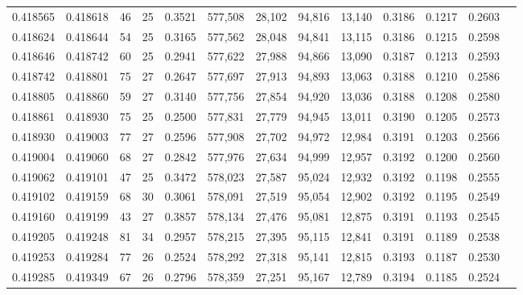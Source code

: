 \begin{tabular}{rrrrrrrrrrrrr}
0.418565 & 0.418618 &    46 &  25 &                                     0.3521 & 577,508 &  28,102 &  94,816 &  13,140 & 0.3186 & 0.1217 & 0.2603 \\
0.418624 & 0.418644 &    54 &  25 &                                     0.3165 & 577,562 &  28,048 &  94,841 &  13,115 & 0.3186 & 0.1215 & 0.2598 \\
0.418646 & 0.418742 &    60 &  25 &                                     0.2941 & 577,622 &  27,988 &  94,866 &  13,090 & 0.3187 & 0.1213 & 0.2593 \\
0.418742 & 0.418801 &    75 &  27 &                                     0.2647 & 577,697 &  27,913 &  94,893 &  13,063 & 0.3188 & 0.1210 & 0.2586 \\
0.418805 & 0.418860 &    59 &  27 &                                     0.3140 & 577,756 &  27,854 &  94,920 &  13,036 & 0.3188 & 0.1208 & 0.2580 \\
0.418861 & 0.418930 &    75 &  25 &                                     0.2500 & 577,831 &  27,779 &  94,945 &  13,011 & 0.3190 & 0.1205 & 0.2573 \\
0.418930 & 0.419003 &    77 &  27 &                                     0.2596 & 577,908 &  27,702 &  94,972 &  12,984 & 0.3191 & 0.1203 & 0.2566 \\
0.419004 & 0.419060 &    68 &  27 &                                     0.2842 & 577,976 &  27,634 &  94,999 &  12,957 & 0.3192 & 0.1200 & 0.2560 \\
0.419062 & 0.419101 &    47 &  25 &                                     0.3472 & 578,023 &  27,587 &  95,024 &  12,932 & 0.3192 & 0.1198 & 0.2555 \\
0.419102 & 0.419159 &    68 &  30 &                                     0.3061 & 578,091 &  27,519 &  95,054 &  12,902 & 0.3192 & 0.1195 & 0.2549 \\
0.419160 & 0.419199 &    43 &  27 &                                     0.3857 & 578,134 &  27,476 &  95,081 &  12,875 & 0.3191 & 0.1193 & 0.2545 \\
0.419205 & 0.419248 &    81 &  34 &                                     0.2957 & 578,215 &  27,395 &  95,115 &  12,841 & 0.3191 & 0.1189 & 0.2538 \\
0.419253 & 0.419284 &    77 &  26 &                                     0.2524 & 578,292 &  27,318 &  95,141 &  12,815 & 0.3193 & 0.1187 & 0.2530 \\
0.419285 & 0.419349 &    67 &  26 &                                     0.2796 & 578,359 &  27,251 &  95,167 &  12,789 & 0.3194 & 0.1185 & 0.2524 \\

\end{tabular}
